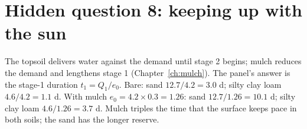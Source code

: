 \section{Hidden question 8: keeping up with the sun}
The topsoil delivers water against the demand until stage 2 begins; mulch reduces the demand and lengthens stage 1 (Chapter~\ref{ch:mulch}). The panel's answer is the stage-1 duration $t_1=Q_1/e_0$.
\sol {}\ans Bare: sand $12.7/4.2=3.0$ d; silty clay loam $4.6/4.2=1.1$ d. With mulch $e_0=4.2\times0.3=1.26$: sand $12.7/1.26=10.1$ d; silty clay loam $4.6/1.26=3.7$ d. Mulch triples the time that the surface keeps pace in both soils; the sand has the longer reserve.
